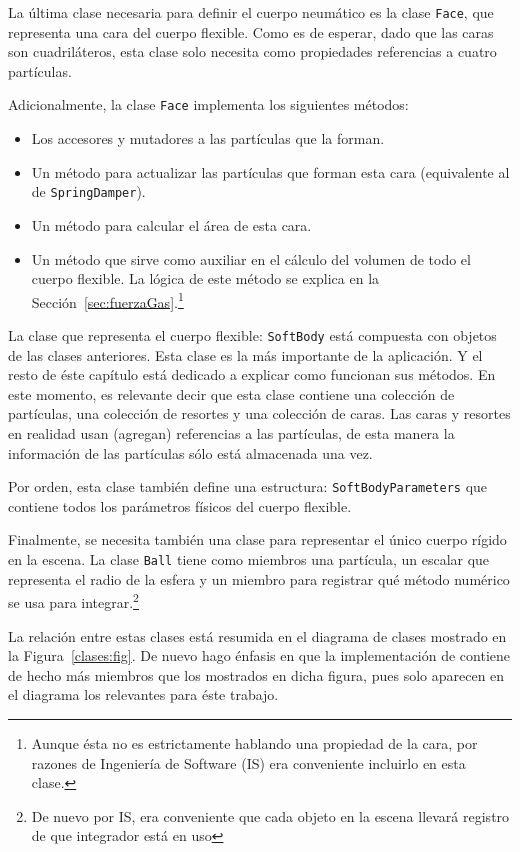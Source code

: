 La última clase necesaria para definir el cuerpo neumático es la clase \texttt{Face}, que representa una cara del cuerpo flexible.
Como es de esperar, dado que las caras son cuadriláteros, esta clase solo necesita como propiedades referencias a cuatro partículas.

Adicionalmente, la clase \texttt{Face} implementa los siguientes métodos:
\begin{itemize}
 \item Los accesores y mutadores a las partículas que la forman.
 \item Un método para actualizar las partículas que forman esta cara (equivalente al de \texttt{SpringDamper}).
 \item Un método para calcular el área de esta cara.
 \item Un método que sirve como auxiliar en el cálculo del volumen de todo el cuerpo flexible. La lógica de este método se explica en la Sección~\ref{sec:fuerzaGas}.\footnote{Aunque ésta no es estrictamente hablando una propiedad de la cara, por razones de Ingeniería de Software (IS) era conveniente incluirlo en esta clase.}
\end{itemize}

La clase que representa el cuerpo flexible: \texttt{SoftBody} está compuesta con objetos de las clases anteriores.
Esta clase es la más importante de la aplicación.
Y el resto de éste capítulo está dedicado a explicar como funcionan sus métodos.
En este momento, es relevante decir que esta clase contiene una colección de partículas, una colección de resortes y una colección de caras.
Las caras y resortes en realidad usan (agregan) referencias a las partículas, de esta manera la información de las partículas sólo está almacenada una vez.

Por orden, esta clase también define una estructura: \texttt{SoftBodyParameters} que contiene todos los parámetros físicos del cuerpo flexible. 
 
Finalmente, se necesita también una clase para representar el único cuerpo rígido en la escena.
La clase \texttt{Ball} tiene como miembros una partícula, un escalar que representa el radio de la esfera y un miembro para registrar qué método numérico se usa para integrar.\footnote{De nuevo por IS, era conveniente que cada objeto en la escena llevará registro de que integrador está en uso}

La relación entre estas clases está resumida en el diagrama de clases mostrado en la Figura~\ref{clases:fig}. De nuevo hago énfasis en que la implementación de contiene de hecho más miembros que los mostrados en dicha figura, pues solo aparecen en el diagrama los relevantes para éste trabajo.


